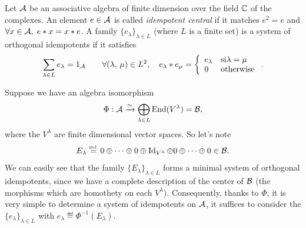 \begin{defn}
  Let $ \mathcal{A} $ be an associative algebra of finite dimension over the field $ \mathbb{C} $ of the complexes. An element $ e \in \mathcal{A} $ is called \textit{idempotent central} if it matches $ e^2 = e $ and $ \forall x \in \mathcal{A}, \; e * x = x * e $. A family $ \{e_{\lambda}\}_{\lambda \in L} $ (where $ L $ is a finite set) is a system of orthogonal idempotents if it satisfies
\begin{equation*}
\sum_{\lambda \in L}{e_{\lambda}} = 1_{\mathcal{A}} \quad \quad \forall (\lambda, \, \mu) \in L^2, \quad e_{\lambda} * e_{\mu} = \left\{\begin{array}{ll} e_{\lambda} & \text{si} \lambda = \mu \\0 & \text{otherwise} \end{array} \right. .
\end{equation*}
\end{defn}
Suppose we have an algebra isomorphism
\begin{equation*}
\Phi: \mathcal{A} \xrightarrow{\simeq} \bigoplus_{\lambda \in L}{\operatorname{End}(V^{\lambda})} = \mathcal{B},
\end{equation*}
where the $ V^{\lambda} $ are finite dimensional vector spaces. So let's note
\begin{equation*}
E_{\lambda} \stackrel{\mbox{\upshape\tiny def.}}{=} 0 \oplus \cdots \oplus 0 \oplus \operatorname{Id}_{V^{\lambda}} \oplus 0 \oplus \cdots \oplus 0 \in \mathcal{B}.
\end{equation*}
We can easily see that the family $ \{E_{\lambda}\}_{\lambda \in L} $ forms a minimal system of orthogonal idempotents, since we have a complete description of the center of $ \mathcal{B} $ (the morphisms which are homothety on each $ V^{\lambda} $). Consequently, thanks to $ \Phi $, it is very simple to determine a system of idempotents on $ \mathcal{A} $, it suffices to consider the $ \{e_{\lambda}\}_{\lambda \in L} $ with $ e_{\lambda} \eqdef \Phi^{-1} (E_{\lambda}) $.
 

